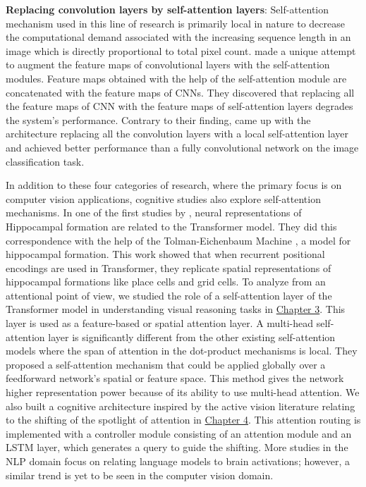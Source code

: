 \textbf{Replacing convolution layers by self-attention layers}: Self-attention mechanism used in this line of research is primarily local in nature to decrease the computational demand associated with the increasing sequence length in an image which is directly proportional to total pixel count. \citet{bello2019attention} made a unique attempt to augment the feature maps of convolutional layers with the self-attention modules. Feature maps obtained with the help of the self-attention module are concatenated with the feature maps of CNNs. They discovered that replacing all the feature maps of CNN with the feature maps of self-attention layers degrades the system's performance. Contrary to their finding, \citet{ramachandran2019stand} came up with the architecture replacing all the convolution layers with a local self-attention layer and achieved better performance than a fully convolutional network on the image classification task. 

In addition to these four categories of research, where the primary focus is on computer vision applications, cognitive studies also explore self-attention mechanisms. In one of the first studies by \citet{whittington2022relating}, neural representations of Hippocampal formation are related to the Transformer model. They did this correspondence with the help of the Tolman-Eichenbaum Machine \cite{whittington2020tolman}, a model for hippocampal formation. This work showed that when recurrent positional encodings are used in Transformer, they replicate spatial representations of hippocampal formations like place cells and grid cells. To analyze from an attentional point of view, we studied the role of a self-attention layer of the Transformer model in understanding visual reasoning tasks in \hyperref[chapter1b]{Chapter 3}. This layer is used as a feature-based or spatial attention layer. A multi-head self-attention layer is significantly different from the other existing self-attention models where the span of attention in the dot-product mechanisms is local. They proposed a self-attention mechanism that could be applied globally over a feedforward network's spatial or feature space. This method gives the network higher representation power because of its ability to use multi-head attention. We also built a cognitive architecture inspired by the active vision literature relating to the shifting of the spotlight of attention in \hyperref[chapter2b]{Chapter 4}. This attention routing is implemented with a controller module consisting of an attention module and an LSTM layer, which generates a query to guide the shifting. More studies in the NLP domain focus on relating language models to brain activations; however, a similar trend is yet to be seen in the computer vision domain. 

